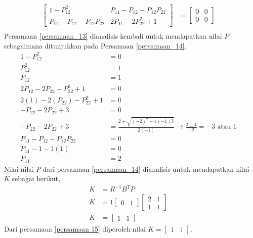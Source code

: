 \documentclass[../main.tex]{subfiles}
\begin{document}
\begin{equation}
\begin{split}
                    \begin{bmatrix} 1-P_{12}^2 & P_{11}-P_{12}-P_{12}P_{22} \\ P_{11}-P_{12}-P_{12}P_{22} & 2P_{11}-2P_{22}^2+1 \end{bmatrix} &= \begin{bmatrix} 0 & 0 \\ 0 & 0 \end{bmatrix}\\[5pt]
                    \label{persamaan_13}
                \end{split}
            \end{equation}
            Persamaan \eqref{persamaan_13} dianalisis kembali untuk mendapatkan nilai $P$ sebagaimana ditunjukkan pada Persamaan \eqref{persamaan_14}.
            \begin{equation}
                \begin{split}
                    1 - P_{12}^2 &= 0 \\[5pt]
                    P_{12}^2 &= 1 \\[5pt]
                    P_{12} &= 1 \\[10pt]
                    2P_{12} - 2P_{22} - P_{22}^2 + 1 &= 0 \\[5pt]
                    2(1) - 2(P_{22}) - P_{22}^2 + 1 & = 0 \\[5pt]
                    -P_{22} - 2P_{22} + 3 &= 0 \\[5pt]
                    -P_{22} - 2P_{22} + 3 &= \frac{2 \pm \sqrt{(-2)^2-4(-1)3}}{2(-1)} \rightarrow \frac{2 \pm 4}{-2} = -3 \text{ atau } 1  \\[10pt]
                    P_{11} - P_{12} - P_{12}P_{22} &= 0 \\[5pt]
                    P_{11} - 1 -1 (1) &= 0 \\[5pt]
                    P_{11} &= 2
                    \label{persamaan_14}
                \end{split}
            \end{equation}
            Nilai-nilai $P$ dari persamaan \eqref{persamaan_14} dianalisis untuk mendapatkan nilai $K$ sebagai berikut,
            \begin{equation}
                \begin{split}
                    K &= R^{-1} B^T P \\[5pt]
                    K &= 1 \begin{bmatrix} 0 & 1 \end{bmatrix} \begin{bmatrix} 2 & 1 \\ 1 & 1 \end{bmatrix} \\[5pt]
                    K &= \begin{bmatrix} 1 & 1 \end{bmatrix}
                    \label{persamaan 15}
                \end{split}
            \end{equation}
            Dari persamaan \eqref{persamaan 15} diperoleh nilai $K = \begin{bmatrix} 1 & 1 \end{bmatrix}$.
\end{document}
